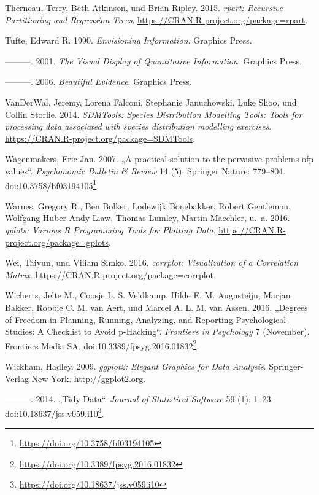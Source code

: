 \documentclass[12pt,ngerman,]{book}
\let\rmarkdownfootnote\footnote%
\def\footnote{\protect\rmarkdownfootnote}
\renewcommand{\href}[2]{#2\footnote{\url{#1}}}
\begin{document}
\hypertarget{ref-R-rpart}{}
Therneau, Terry, Beth Atkinson, und Brian Ripley. 2015. \emph{rpart:
Recursive Partitioning and Regression Trees}.
\url{https://CRAN.R-project.org/package=rpart}.

\hypertarget{ref-1930824149}{}
Tufte, Edward R. 1990. \emph{Envisioning Information}. Graphics Press.

\hypertarget{ref-1930824130}{}
---------. 2001. \emph{The Visual Display of Quantitative Information}.
Graphics Press.

\hypertarget{ref-1930824165}{}
---------. 2006. \emph{Beautiful Evidence}. Graphics Press.

\hypertarget{ref-R-SDMTools}{}
VanDerWal, Jeremy, Lorena Falconi, Stephanie Januchowski, Luke Shoo, und
Collin Storlie. 2014. \emph{SDMTools: Species Distribution Modelling
Tools: Tools for processing data associated with species distribution
modelling exercises}. \url{https://CRAN.R-project.org/package=SDMTools}.

\hypertarget{ref-Wagenmakers2007}{}
Wagenmakers, Eric-Jan. 2007. „A practical solution to the pervasive
problems ofp values``. \emph{Psychonomic Bulletin \& Review} 14 (5).
Springer Nature: 779--804.
doi:\href{https://doi.org/10.3758/bf03194105}{10.3758/bf03194105}.

\hypertarget{ref-R-gplots}{}
Warnes, Gregory R., Ben Bolker, Lodewijk Bonebakker, Robert Gentleman,
Wolfgang Huber Andy Liaw, Thomas Lumley, Martin Maechler, u.~a. 2016.
\emph{gplots: Various R Programming Tools for Plotting Data}.
\url{https://CRAN.R-project.org/package=gplots}.

\hypertarget{ref-R-corrplot}{}
Wei, Taiyun, und Viliam Simko. 2016. \emph{corrplot: Visualization of a
Correlation Matrix}. \url{https://CRAN.R-project.org/package=corrplot}.

\hypertarget{ref-Wicherts2016}{}
Wicherts, Jelte M., Coosje L. S. Veldkamp, Hilde E. M. Augusteijn,
Marjan Bakker, Robbie C. M. van Aert, und Marcel A. L. M. van Assen.
2016. „Degrees of Freedom in Planning, Running, Analyzing, and Reporting
Psychological Studies: A Checklist to Avoid p-Hacking``. \emph{Frontiers
in Psychology} 7 (November). Frontiers Media SA.
doi:\href{https://doi.org/10.3389/fpsyg.2016.01832}{10.3389/fpsyg.2016.01832}.

\hypertarget{ref-R-ggplot2}{}
Wickham, Hadley. 2009. \emph{ggplot2: Elegant Graphics for Data
Analysis}. Springer-Verlag New York. \url{http://ggplot2.org}.

\hypertarget{ref-tidydata}{}
---------. 2014. „Tidy Data``. \emph{Journal of Statistical Software} 59
(1): 1--23.
doi:\href{https://doi.org/10.18637/jss.v059.i10}{10.18637/jss.v059.i10}.
\end{document}
